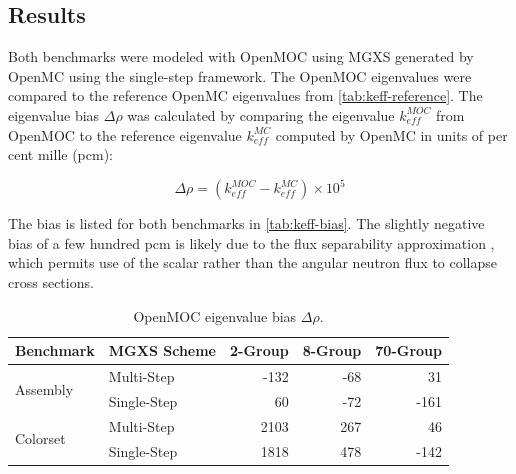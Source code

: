 \subsection{Results}
\label{subsec:results}

Both benchmarks were modeled with OpenMOC using MGXS generated by OpenMC using the single-step framework. The OpenMOC eigenvalues were compared to the reference OpenMC eigenvalues from \autoref{tab:keff-reference}. The eigenvalue bias $\Delta\rho$ was calculated by comparing the eigenvalue $k_{eff}^{MOC}$ from OpenMOC to the reference eigenvalue $k_{eff}^{MC}$ computed by OpenMC in units of per cent mille (pcm):

\begin{equation}
\label{eqn:delta-rho}
\Delta\rho = \left(k_{eff}^{MOC} - k_{eff}^{MC}\right) \times 10^{5}
\end{equation}

The bias is listed for both benchmarks in \autoref{tab:keff-bias}. The slightly negative bias of a few hundred pcm is likely due to the flux separability approximation \cite{boyd2018sph}, which permits use of the scalar rather than the angular neutron flux to collapse cross sections. 


\begin{table}[h!]
  \centering
  \caption{OpenMOC eigenvalue bias $\Delta\rho$.}
  \label{tab:keff-bias} 
  \begin{tabular}{l l r r r}
  \toprule
  \textbf{Benchmark} & \textbf{MGXS Scheme} & \textbf{2-Group} & \textbf{8-Group} & \textbf{70-Group} \\
  \midrule
  \multirow{2}{*}{Assembly} & Multi-Step    & -132 & -68 &   31 \\
                            & Single-Step &   60 & -72 & -161 \\
  \midrule
  \multirow{2}{*}{Colorset} & Multi-Step    & 2103 & 267 &   46 \\
                            & Single-Step & 1818 & 478 & -142 \\
  \bottomrule
\end{tabular}
\end{table}

